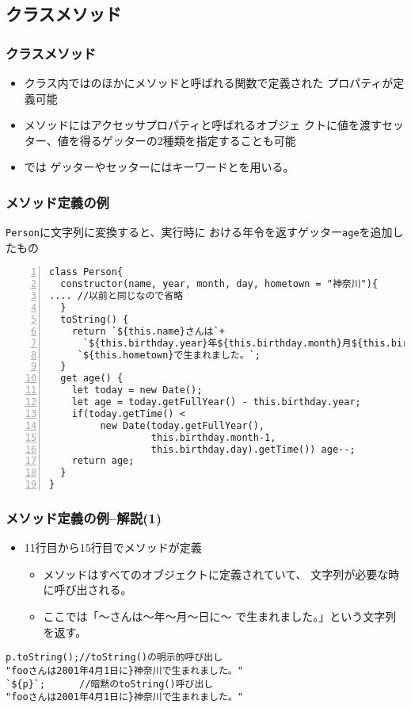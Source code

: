 \subsection{クラスメソッド}
\begin{frame}[containsverbatim]
 \frametitle{クラスメソッド}
\begin{itemize}
 \item クラス内ではのほかにメソッドと呼ばれる関数で定義された
プロパティが定義可能
 \item メソッドにはアクセッサプロパティと呼ばれるオブジェ
クトに値を渡すセッター、値を得るゲッターの2種類を指定することも可能
 \item \ES では
ゲッターやセッターにはキーワードとを用いる。
\end{itemize} 
 \end{frame}
\begin{frame}[containsverbatim]
 \frametitle{メソッド定義の例}
\texttt{Person}に文字列に変換すると、実行時に
 おける年令を返すゲッター\texttt{age}を追加したもの
 {\scriptsize
\begin{Verbatim}[numbers=left]
class Person{
  constructor(name, year, month, day, hometown = "神奈川"){
.... //以前と同じなので省略
  }
  toString() {
    return `${this.name}さんは`+
      `${this.birthday.year}年${this.birthday.month}月${this.birthday.day}日に` +
     `${this.hometown}で生まれました。`;
  }
  get age() {
    let today = new Date();
    let age = today.getFullYear() - this.birthday.year;
    if(today.getTime() <
         new Date(today.getFullYear(),
                  this.birthday.month-1,
                  this.birthday.day).getTime()) age--;
    return age;
  }
}
\end{Verbatim}
 }
\end{frame}
\begin{frame}[containsverbatim]
 \frametitle{メソッド定義の例--解説(1)}
 \begin{itemize}
  \item 11行目から15行目でメソッドが定義
        \begin{itemize}
         \item {}メソッドはすべてのオブジェクトに定義されていて、
 文字列が必要な時に呼び出される。
         \item ここでは「～さんは～年～月～日に～
               で生まれました。」という文字列を返す。
        \end{itemize}
 \end{itemize}
\begin{Verbatim}
p.toString();//toString()の明示的呼び出し
"fooさんは2001年4月1日に}神奈川で生まれました。"
`${p}`;      //暗黙のtoString()呼び出し
"fooさんは2001年4月1日に}神奈川で生まれました。"
\end{Verbatim}
 \end{frame}
